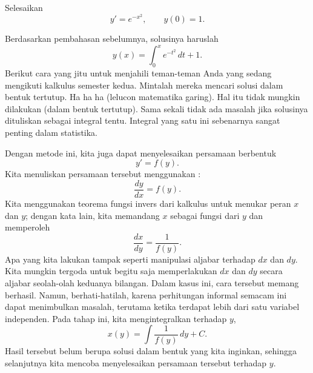 \begin{example}
Selesaikan
\begin{equation*}
y' = e^{-x^2}, \qquad y(0) = 1 .
\end{equation*}

Berdasarkan pembahasan sebelumnya, solusinya haruslah
\begin{equation*}
y(x) = \int_0^x e^{-t^2} \,dt + 1 .
\end{equation*}
Berikut cara yang jitu untuk menjahili teman-teman Anda yang sedang mengikuti
kalkulus semester kedua. Mintalah mereka
mencari solusi dalam bentuk tertutup. Ha ha ha (lelucon matematika garing). Hal itu
tidak mungkin dilakukan (dalam bentuk tertutup).
Sama sekali tidak ada masalah jika solusinya dituliskan sebagai
integral tentu.
Integral yang satu ini
sebenarnya sangat penting
dalam statistika.
\end{example}

Dengan metode ini, kita juga dapat menyelesaikan persamaan berbentuk
\begin{equation*}
y' = f(y) .
\end{equation*}
Kita menuliskan persamaan tersebut menggunakan :
\begin{equation*}
\frac{dy}{dx} = f(y) .
\end{equation*}
Kita menggunakan teorema fungsi invers dari kalkulus
untuk menukar peran $x$ dan $y$; dengan kata lain,
kita memandang $x$ sebagai fungsi dari $y$ dan memperoleh
\begin{equation*}
\frac{dx}{dy} = \frac{1}{f(y)} .
\end{equation*}
Apa yang
kita lakukan tampak seperti manipulasi aljabar terhadap $dx$ dan $dy$.
Kita mungkin tergoda untuk begitu saja memperlakukan $dx$
dan $dy$ secara aljabar seolah-olah keduanya bilangan. Dalam kasus ini, cara tersebut memang berhasil. Namun,
berhati-hatilah,
karena perhitungan informal semacam ini dapat menimbulkan masalah,
terutama ketika
terdapat lebih dari satu variabel independen.
Pada tahap ini, kita mengintegralkan terhadap $y$,
\begin{equation*}
x(y) = \int \frac{1}{f(y)} \,dy + C .
\end{equation*}
Hasil tersebut belum berupa solusi dalam bentuk yang kita inginkan, sehingga
selanjutnya kita mencoba menyelesaikan persamaan tersebut terhadap $y$.

